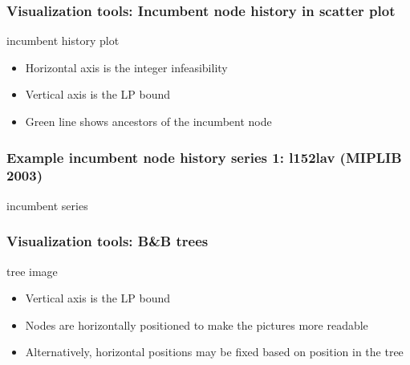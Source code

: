 \documentclass{beamer}
\begin{document}

\begin{frame}
\frametitle{Visualization tools: Incumbent node history in scatter plot}

\begin{center}
incumbent history plot
\end{center}
\begin{itemize}
\item Horizontal axis is the integer infeasibility
\item Vertical axis is the LP bound
\item Green line shows ancestors of the incumbent node
\end{itemize}
\end{frame}

\begin{frame}
\frametitle{Example incumbent node history series 1: l152lav (MIPLIB 2003)}

\begin{center}
incumbent series
\end{center}
\end{frame}



\begin{frame}
\frametitle{Visualization tools: B\&B trees}

\begin{center}
tree image
\end{center}
\begin{itemize}
\item Vertical axis is the LP bound
\item Nodes are horizontally positioned to make the pictures more readable
\item Alternatively, horizontal positions may be fixed based on position in the
tree
\end{itemize}
\end{frame}
\end{document}
